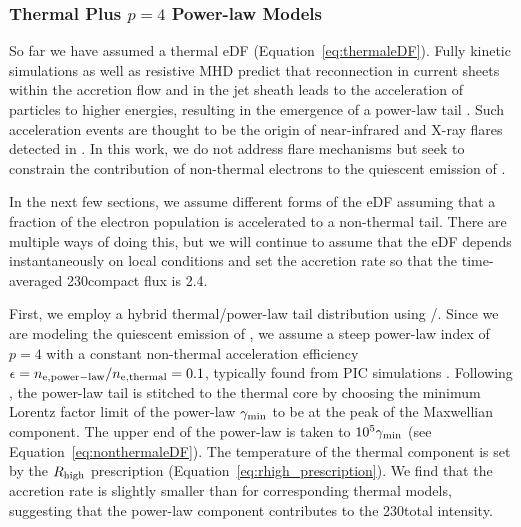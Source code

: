 \subsubsection{Thermal Plus \texorpdfstring{$p = 4$}{p=4} Power-law Models}

So far we have assumed a thermal eDF (Equation~\ref{eq:thermaleDF}).
Fully kinetic simulations as well as resistive MHD predict that reconnection in current sheets within the accretion flow and in the jet sheath leads to the acceleration of particles to higher energies, resulting in the emergence of a power-law tail  \citep[e.g.,][and references therein]{Sironi2021}.
Such acceleration events are thought to be the origin of near-infrared and X-ray flares detected in \sgra.
In this work, we do not address flare mechanisms but seek to constrain the contribution of non-thermal electrons to the quiescent emission of \sgra.

In the next few sections, we assume different forms of the eDF assuming that a fraction of the electron population is accelerated to a non-thermal tail.
There are multiple ways of doing this, but we will continue to assume that the eDF depends instantaneously on local conditions and set the accretion rate so that the time-averaged 230\GHz compact flux is 2.4\Jy.

First, we employ a hybrid thermal/power-law tail distribution using \hamr/\bhoss.
Since we are modeling the quiescent emission of \sgra, we assume a steep power-law index of $p=4$ with a constant non-thermal acceleration efficiency $\epsilon=n_{\rm e, power-law}/n_{\rm e, thermal}=0.1$, typically found from PIC simulations \citep[e.g.,][]{Sironi2015,Crumley2019}.
Following \citet{Chatterjee2021}, the power-law tail is stitched to the thermal core by choosing the minimum Lorentz factor limit of the power-law $\gamma_{\rm min}$ to be at the peak of the Maxwellian component.
The upper end of the power-law is taken to $10^5 \gamma_{\rm min}$ (see Equation~\ref{eq:nonthermaleDF}).
The temperature of the thermal component is set by the $R_\mathrm{high}$ prescription (Equation~\ref{eq:rhigh_prescription}).
We find that the accretion rate is slightly smaller than for corresponding thermal models, suggesting that the power-law component contributes to the 230\GHz total intensity.


